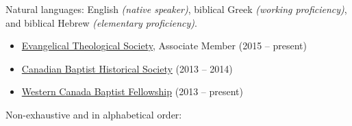 \documentclass[10pt,letterpaper]{article} %
\begin{document}
\inlineheadsection %
{Natural languages:}
{English \textit{(native speaker)}, biblical Greek \textit{(working proficiency)}, and biblical Hebrew \textit{(elementary proficiency)}.}


\spacedhrule{1.6em}{-0.4em} %



\begin{itemize}
\item \href{http://www.etsjets.org/}{Evangelical Theological Society}, Associate Member (2015 -- present)
\item \href{https://www.facebook.com/canadianbaptisthistory}{Canadian Baptist Historical Society} (2013 -- 2014)
\item \href{http://wcbf.net/}{Western Canada Baptist Fellowship} (2013 -- present)
\end{itemize}



\spacedhrule{1.6em}{-0.4em} %



\inlineheadsection %
{Non-exhaustive and in alphabetical order:}
{

}

\end{document}
